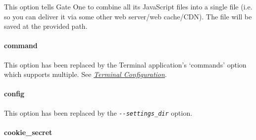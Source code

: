 \documentclass[letterpaper,10pt,openany]{sphinxmanual}
\begin{document}
\begin{fulllineitems}
\label{About/configuration:cmdoption--combine_js}
\end{fulllineitems}


This option tells Gate One to combine all its JavaScript files into a single file (i.e. so you can deliver it via some other web server/web cache/CDN).  The file will be saved at the provided path.


\paragraph{command}
\label{About/configuration:command}

\begin{fulllineitems}
\label{About/configuration:cmdoption--command}
\end{fulllineitems}


This option has been replaced by the Terminal application's `commands' option which supports multiple.  See {\hyperref[Applications/terminal/configuration:terminal-configuration]{\emph{Terminal Configuration}}}.


\paragraph{config}
\label{About/configuration:config}

\begin{fulllineitems}
\label{About/configuration:cmdoption--config}
\end{fulllineitems}


This option has been replaced by the \emph{\texttt{-{-}settings\_dir}} option.


\paragraph{cookie\_secret}
\label{About/configuration:cookie-secret}
\end{document}

